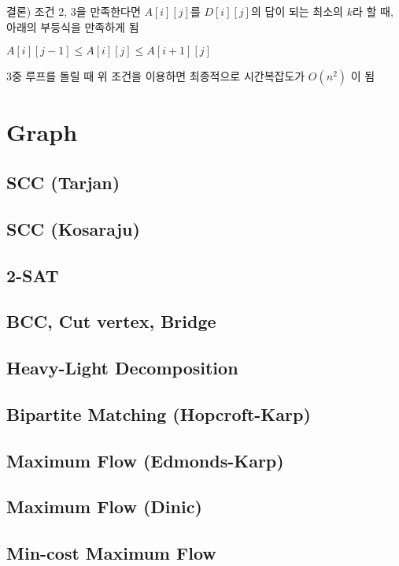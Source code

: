 \documentclass[10pt,landscape,a4paper,twocolumn]{article}
\begin{document}
결론) 조건 2, 3을 만족한다면  $A[i][j]$를 $D[i][j]$의 답이 되는 최소의 $k$라 할 때, 아래의 부등식을 만족하게 됨

$A[i][j-1] \leq A[i][j] \leq A[i+1][j]$

3중 루프를 돌릴 때 위 조건을 이용하면 최종적으로 시간복잡도가 $O(n^{2})$ 이 됨

\section{Graph}

\subsection{SCC (Tarjan)}

\subsection{SCC (Kosaraju)}

\subsection{2-SAT}

\subsection{BCC, Cut vertex, Bridge}

\subsection{Heavy-Light Decomposition}

\subsection{Bipartite Matching (Hopcroft-Karp)}

\subsection{Maximum Flow (Edmonds-Karp)}

\subsection{Maximum Flow (Dinic)}

\subsection{Min-cost Maximum Flow}
\end{document}
